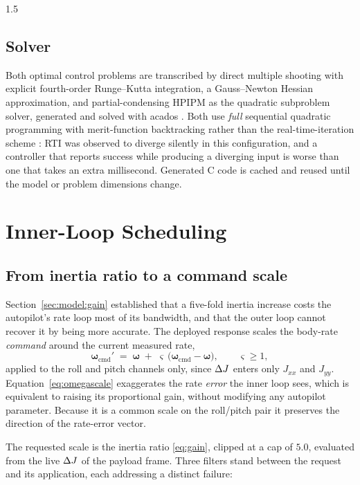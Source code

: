\begin{spacing}{1.5}
\subsection{Solver}\label{sec:frame:solver}

Both optimal control problems are transcribed by direct multiple shooting with
explicit fourth-order Runge--Kutta integration, a Gauss--Newton Hessian
approximation, and partial-condensing HPIPM \cite{hpipm} as the quadratic
subproblem solver, generated and solved with acados \cite{acados}. Both use
\emph{full} sequential quadratic programming with merit-function backtracking
rather than the real-time-iteration scheme \cite{diehl2005rti}: RTI was observed
to diverge silently in this configuration, and a controller that reports success
while producing a diverging input is worse than one that takes an extra
millisecond. Generated C code is cached and reused until the model or problem
dimensions change.

\section{Inner-Loop Scheduling}\label{sec:frame:omegascale}

\subsection{From inertia ratio to a command scale}\label{sec:frame:scale}

Section~\ref{sec:model:gain} established that a five-fold inertia increase costs
the autopilot's rate loop most of its bandwidth, and that the outer loop cannot
recover it by being more accurate. The deployed response scales the body-rate
\emph{command} around the current measured rate,
\begin{equation}
\bm\omega_{\mathrm{cmd}}' \;=\; \bm\omega \;+\; \varsigma\,\bigl(\bm\omega_{\mathrm{cmd}} - \bm\omega\bigr),
\qquad \varsigma \ge 1,
\label{eq:omegascale}
\end{equation}
applied to the roll and pitch channels only, since $\Delta J$ enters only $J_{xx}$ and
$J_{yy}$. Equation~\eqref{eq:omegascale} exaggerates the rate \emph{error} the
inner loop sees, which is equivalent to raising its proportional gain, without
modifying any autopilot parameter. Because it is a common scale on the roll/pitch
pair it preserves the direction of the rate-error vector.

The requested scale is the inertia ratio \eqref{eq:gain}, clipped at a cap of
$5.0$, evaluated from the live $\Delta J$ of the payload frame. Three filters stand
between the request and its application, each addressing a distinct failure:


\end{spacing}
